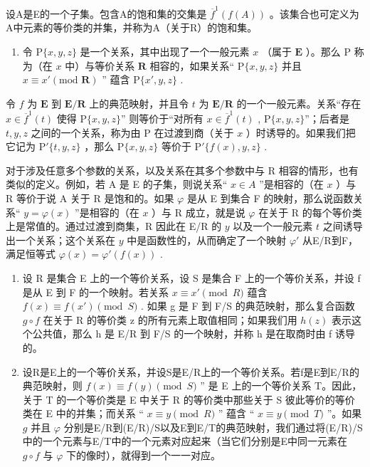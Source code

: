 设A是E的一个子集。包含A的饱和集的交集是 \(\overline{f}^{1}(f(A))\) 。该集合也可定义为A中元素的等价类的并集，并称为A（关于R）的饱和集。

\begin{enumerate}
\def\labelenumi{\arabic{enumi}.}
\setcounter{enumi}{6}
\tightlist
\item
  令 \(\mathrm{P}\{x, y, z\}\) 是一个关系，其中出现了一个一般元素 \(x\) （属于 \(\mathbf{E}\) ）。那么 \(\mathrm{P}\) 称为（在 \(x\) 中）与等价关系 \(\mathbf{R}\) 相容的，如果关系“ \(\mathrm{P}\{x, y, z\}\) 并且 \(x \equiv x' (\text{mod } \mathbf{R})\) '' 蕴含 \(\mathrm{P}\{x', y, z\}\) .
\end{enumerate}

令 \(f\) 为 \(\mathbf{E}\) 到 \(\mathbf{E} / \mathbf{R}\) 上的典范映射，并且令 \(t\) 为 \(\mathbf{E} / \mathbf{R}\) 的一个一般元素。关系“存在 \(x \in \overline{f}^1(t)\) 使得 \(\mathrm{P}\{x, y, z\}\)'' 则等价于“对所有 \(x \in \overline{f}^1(t)\) , \(\mathrm{P}\{x, y, z\}\)''；后者是 \(t, y, z\) 之间的一个关系，称为由 \(\mathrm{P}\) 在过渡到商（关于 \(x\) ）时诱导的。如果我们把它记为 \(\mathrm{P}'\{t, y, z\}\) ，那么 \(\mathrm{P}\{x, y, z\}\) 等价于 \(\mathrm{P}'\{f(x), y, z\}\) .

对于涉及任意多个参数的关系，以及关系在其多个参数中与 R 相容的情形，也有类似的定义。例如，若 A 是 E 的子集，则说关系“ \(x \in A\) ”是相容的（在 \(x\) ）与 R 等价于说 A 关于 R 是饱和的。如果 \(\varphi\) 是从 E 到集合 F 的映射，那么说函数关系“ \(y = \varphi(x)\) ”是相容的（在 \(x\) ）与 R 成立，就是说 \(\varphi\) 在关于 R 的每个等价类上是常值的。通过过渡到商集，R 因此在 E/R 的 \(y\) 以及一个一般元素 \(t\) 之间诱导出一个关系；这个关系在 \(y\) 中是函数性的，从而确定了一个映射 \(\varphi'\) 从E/R到F，满足恒等式 \(\varphi(x) = \varphi'(f(x))\) .

\begin{enumerate}
\def\labelenumi{\arabic{enumi}.}
\setcounter{enumi}{7}
\item
  设 R 是集合 E 上的一个等价关系，设 S 是集合 F 上的一个等价关系，并设 f 是从 E 到 F 的一个映射。若关系 \(x \equiv x' \pmod{R}\) 蕴含 \(f(x) \equiv f(x') \pmod{S}\) . 如果 g 是 F 到 F/S 的典范映射，那么复合函数 \(g \circ f\) 在关于 R 的等价类 z 的所有元素上取值相同；如果我们用 \(h(z)\) 表示这个公共值，那么 h 是 E/R 到 F/S 的一个映射，并称 h 是在取商时由 f 诱导的。
\item
  设R是E上的一个等价关系，并设S是E/R上的一个等价关系。若f是E到E/R的典范映射，则 \(f(x) \equiv f(y) \pmod{S}\) '' 是 E 上的一个等价关系 T。因此，关于 T 的一个等价类是 E 中关于 R 的等价类中那些关于 S 彼此等价的等价类在 E 中的并集；而关系 `` \(x \equiv y \pmod{R}\) '' 蕴含 `` \(x \equiv y \pmod{T}\) ''。如果 \(g\) 并且 \(\varphi\) 分别是E/R到(E/R)/S以及E到E/T的典范映射，我们通过将(E/R)/S中的一个元素与E/T中的一个元素对应起来（当它们分别是E中同一元素在 \(g \circ f\) 与 \(\varphi\) 下的像时），就得到一个一一对应。
\end{enumerate}

